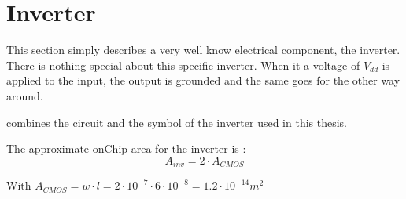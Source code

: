 \section{Inverter}
\label{sec:inv}

This section simply describes a very well know electrical component, the inverter. There is nothing special about this specific inverter. When it a voltage of $V_{dd}$ is applied to the input, the output is grounded and the same goes for the other way around.

\begin{figure}[H]
  \centering
  \hspace*{2.5cm}
  \hfill
  \hspace*{1.5cm}
  \caption{}
  \label{fig:inv}
\end{figure}

 combines the circuit and the symbol of the inverter used in this thesis.

The approximate onChip area for the inverter is :
\begin{equation}
  A_{inv}=2\cdot A_{CMOS}
\end{equation}

With $A_{CMOS}= w\cdot l=2\cdot 10^{-7}\cdot6\cdot10^{-8} =1.2\cdot10^{-14}m^2$

